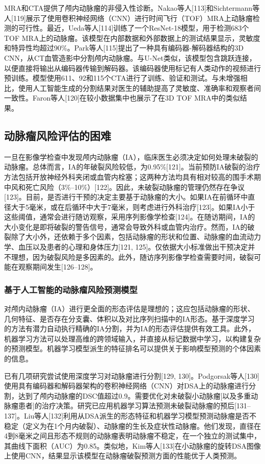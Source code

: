 \documentclass[11pt]{article}
\begin{document}
MRA和CTA提供了颅内动脉瘤的非侵入性诊断。Nakao等人[113]和Sichtermann等人[119]展示了使用卷积神经网络（CNN）进行时间飞行（TOF）MRA上动脉瘤检测的可行性。最近，Ueda等人[114]训练了一个ResNet-18模型，用于检测683个TOF MRA上的动脉瘤。该模型在内部数据和外部数据上的测试结果显示，灵敏度和特异性均超过90\%。Park等人[115]提出了一种具有编码器-解码器结构的3D CNN，从CT血管造影中分割颅内动脉瘤。与U-Net类似，该模型包含跳跃连接，以便直接将输出从编码器传输到解码器。该编码器使用标记有人类动作的视频进行预训练。模型使用611、92和115个CTA进行了训练、验证和测试。与未增强相比，使用人工智能生成的分割结果对医生的辅助提高了灵敏度、准确率和观察者间一致性。Faron等人[120]在较小数据集中也展示了在3D TOF MRA中的类似结果。

\subsection{\kaishu 动脉瘤风险评估的困难}

一旦在影像学检查中发现颅内动脉瘤（IA），临床医生必须决定如何处理未破裂的动脉瘤。总体而言，IA的年破裂风险较低，为0.95\%[121]。当前预防IA破裂的治疗方法包括开放神经外科夹闭或血管内栓塞；这两种方法均具有相对较高的围手术期中风和死亡风险（3\%–10\%）[122]。因此，未破裂动脉瘤的管理仍然存在争议[123]。目前，是否进行干预的决定主要基于动脉瘤的大小。如果IA在前循环中直径大于5毫米，或在后循环中大于7毫米，则考虑进行外科治疗[123]。如果IA小于这些阈值，通常会进行随访观察，采用序列影像学检查[124]。在随访期间，IA的大小变化是即将破裂的警告信号，通常会导致外科或血管内治疗。然而，IA的破裂除了大小外，还依赖于多个因素，包括动脉瘤的形状和位置、动脉瘤的血流动力学、血压以及患者的心理和身体压力[121, 125]。仅依据大小标准做出干预决定并不理想，因为破裂风险是多因素的。此外，随访序列影像学检查需要时间，破裂可能在观察期间发生[126–128]。

\subsubsection{\kaishu 基于人工智能的动脉瘤风险预测模型}

对颅内动脉瘤（IA）进行更全面的形态评估是理想的；这应包括动脉瘤的形状、几何特征、是否存在分支囊、体积以及对比序列扫描中的IA形态。基于深度学习的方法有潜力自动执行精确的IA分割，并为IA的形态评估提供有效工具。此外，机器学习方法可以处理高维的跨领域输入，并直接从标记数据中学习，以构建复杂的预测模型。机器学习模型派生的特征排名可以提供关于影响模型预测的个体因素的信息。

已有几项研究尝试使用深度学习对动脉瘤进行分割[129, 130]。Podgorsak等人[130]使用具有编码器和解码器架构的卷积神经网络（CNN）对DSA上的动脉瘤进行分割，达到了颅内动脉瘤的DSC值超过0.9。需要优化对未破裂小动脉瘤[以及多重动脉瘤患者]的治疗决策。研究已应用机器学习算法预测未破裂动脉瘤的预后[131–137]。Liu等人[132]利用从DSA派生的形态特征和机器学习模型预测动脉瘤是否不稳定（定义为在1个月内破裂）、动脉瘤的生长及症状性动脉瘤。他们发现，直径在4到8毫米之间且形态不规则的动脉瘤表明动脉瘤不稳定，在一个独立的测试集中，其曲线下面积（AUC）为0.85。类似地，Kim等人[133]在小动脉瘤的旋转DSA图像上使用CNN，结果显示该模型在动脉瘤破裂预测方面的性能优于人类预测。
\end{document}
